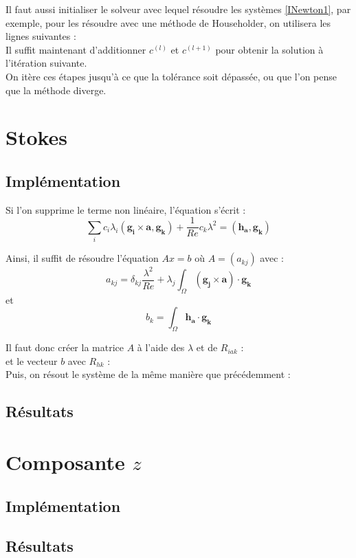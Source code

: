 Il faut aussi initialiser le solveur avec lequel résoudre les systèmes \ref{INewton1}, par exemple, pour les résoudre avec une méthode de Householder, on utilisera les lignes suivantes :\\


Il suffit maintenant d'additionner $c^{(l)}$ et $c^{(l+1)}$ pour obtenir la solution à l'itération suivante.\\


On itère ces étapes jusqu'à ce que la tolérance soit dépassée, ou que l'on pense que la méthode diverge.

\section{Stokes}
\subsection{Implémentation}

Si l'on supprime le terme non linéaire, l'équation s'écrit :
\[ \sum_i c_i\lambda_i(\bm{g_i}\times\bm{a},\bm{g_k}) +\frac{1}{Re}c_k\lambda^2 = (\bm{h_a},\bm{g_k}) \]

Ainsi, il suffit de résoudre l'équation $Ax=b$ où $A=(a_{kj})$ avec :
\[ a_{kj} = \delta_{kj}\frac{\lambda^2}{Re} + \lambda_j\int_\Omega (\bm{g_j}\times\bm{a})\cdot\bm{g_k} \]
et
\[ b_k = \int_\Omega \bm{h_a}\cdot\bm{g_k} \]

Il faut donc créer la matrice $A$ à l'aide des $\lambda$ et de $R_{iak}$ :\\

et le vecteur $b$ avec $R_{hk}$ :\\


Puis, on résout le système de la même manière que précédemment :\\


\subsection{Résultats}

\section{Composante $z$}
\subsection{Implémentation}
\subsection{Résultats}


